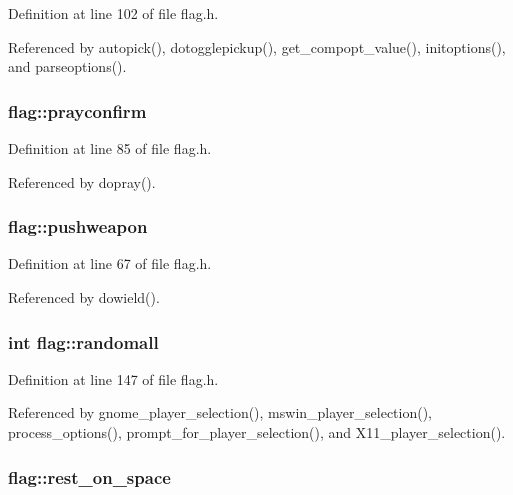 Definition at line 102 of file flag.\+h.



Referenced by autopick(), dotogglepickup(), get\+\_\+compopt\+\_\+value(), initoptions(), and parseoptions().

\hypertarget{structflag_aa7e2be04624993681dcb42a4ca3e6b45}{
\subsubsection[{prayconfirm}]{ flag\+::prayconfirm}}\label{structflag_aa7e2be04624993681dcb42a4ca3e6b45}


Definition at line 85 of file flag.\+h.



Referenced by dopray().

\hypertarget{structflag_a5033ffab33ed5af8af75952e59a61b83}{
\subsubsection[{pushweapon}]{ flag\+::pushweapon}}\label{structflag_a5033ffab33ed5af8af75952e59a61b83}


Definition at line 67 of file flag.\+h.



Referenced by dowield().

\hypertarget{structflag_a06854edfd7c6649ef7381c7ca1865f85}{
\subsubsection[{randomall}]{\setlength{\rightskip}{0pt plus 5cm}int flag\+::randomall}}\label{structflag_a06854edfd7c6649ef7381c7ca1865f85}


Definition at line 147 of file flag.\+h.



Referenced by gnome\+\_\+player\+\_\+selection(), mswin\+\_\+player\+\_\+selection(), process\+\_\+options(), prompt\+\_\+for\+\_\+player\+\_\+selection(), and X11\+\_\+player\+\_\+selection().

\hypertarget{structflag_a0c5d77245e38093d83199c38f23535fc}{
\subsubsection[{rest\+\_\+on\+\_\+space}]{ flag\+::rest\+\_\+on\+\_\+space}}\label{structflag_a0c5d77245e38093d83199c38f23535fc}


